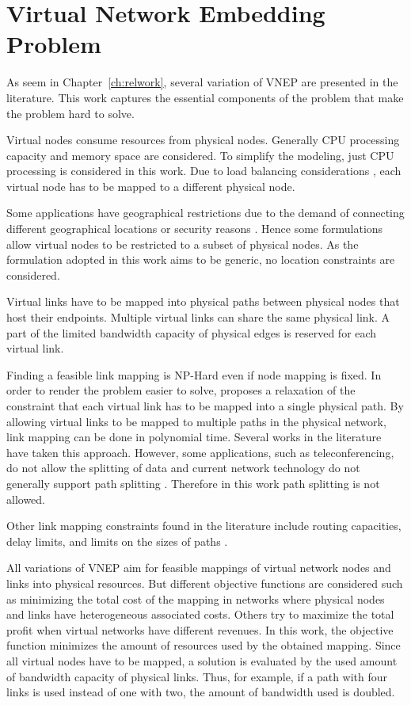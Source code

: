 \chapter{Virtual Network Embedding Problem}
\label{ch:problem}

As seem in Chapter~\ref{ch:relwork}, several variation of VNEP are presented in the literature. This work captures the essential components of the problem that make the problem hard to solve.

Virtual nodes consume resources from physical nodes. 
Generally CPU processing capacity and memory space are considered.
To simplify the modeling, just CPU processing is considered in this work.
Due to load balancing considerations \cite{Houidi:2011}, each virtual node has to be mapped to a different physical node.

Some applications have geographical restrictions due to the demand of connecting different geographical locations or security reasons \cite{Buriol:2012}.
Hence some formulations allow virtual nodes to be restricted to a subset of physical nodes.
As the formulation adopted in this work aims to be generic, no location constraints are considered.

Virtual links have to be mapped into physical paths between physical nodes that host their endpoints.
Multiple virtual links can share the same physical link.
A part of the limited bandwidth capacity of physical edges is reserved for each virtual link.

Finding a feasible link mapping is NP-Hard even if node mapping is fixed. In order to render the problem easier to solve, \citet{Yu2008} proposes a relaxation of the constraint that each virtual link has to be mapped into a single physical path.
By allowing virtual links to be mapped to multiple paths in the physical network, link mapping can be done in polynomial time.
Several works in the literature have taken this approach.
However, some applications, such as teleconferencing, do not allow the splitting of data \cite{Barnhart:2000} and 
current network technology do not generally support path splitting \cite{Guerzoni:2014}.
Therefore in this work path splitting is not allowed.

Other link mapping constraints found in the literature include routing capacities, delay limits, and limits on the sizes of paths \cite{infuhr:2011}.

All variations of VNEP aim for feasible mappings of virtual network nodes and links into physical resources. 
But different objective functions are considered such as minimizing the total cost of the mapping in networks where physical nodes and links have heterogeneous associated costs.
Others try to maximize the total profit when virtual networks have different revenues.
In this work, the objective function minimizes the amount of resources used by the obtained mapping.
Since all virtual nodes have to be mapped, a solution is evaluated by the used amount of bandwidth capacity of physical links.
Thus, for example, if a path with four links is used instead of one with two, the amount of bandwidth used is doubled.

